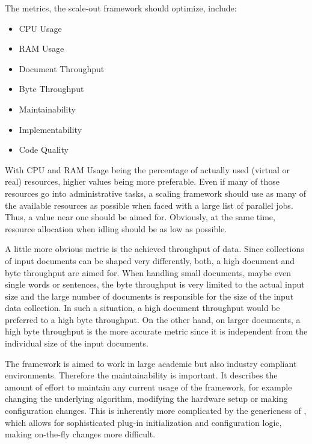 The metrics, the scale-out framework should optimize, include:
\begin{itemize}
\item CPU Usage
\item RAM Usage
\item Document Throughput
\item Byte Throughput
\item Maintainability
\item Implementability
\item Code Quality
\end{itemize}
With CPU and RAM Usage being the percentage of actually used (virtual or real) resources, higher values being more preferable. Even if many of those resources go into administrative tasks, a scaling framework should use as many of the available resources as possible when faced with a large list of parallel jobs. Thus, a value near one should be aimed for. Obviously, at the same time, resource allocation when idling should be as low as possible.

A little more obvious metric is the achieved throughput of data. Since collections of input documents can be shaped very differently, both, a high document and byte throughput are aimed for. When handling small documents, maybe even single words or sentences, the byte throughput is very limited to the actual input size and the large number of documents is responsible for the size of the input data collection. In such a situation, a high document throughput would be preferred to a high byte throughput. On the other hand, on larger documents, a high byte throughput is the more accurate metric since it is independent from the individual size of the input documents.

The framework is aimed to work in large academic but also industry compliant environments. Therefore the maintainability is important. It describes the amount of effort to maintain any current usage of the framework, for example changing the underlying \nlp{} algorithm, modifying the hardware setup or making configuration changes. This is inherently more complicated by the genericness of \uima{}, which allows for sophisticated plug-in initialization and configuration logic, making on-the-fly changes more difficult.

